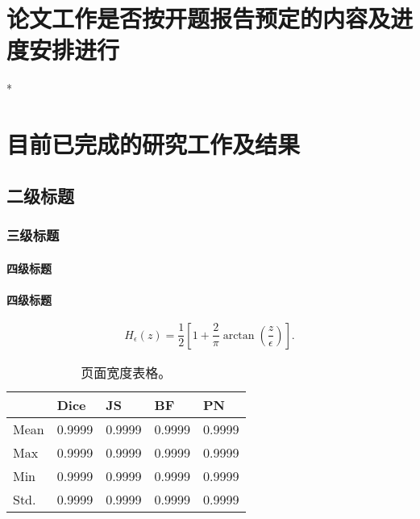 \section{论文工作是否按开题报告预定的内容及进度安排进行}*

\lipsum[1]

\section{目前已完成的研究工作及结果}

\subsection{二级标题}
\subsubsection{三级标题}
\paragraph{四级标题}
\lipsum[2]
\paragraph{四级标题}

\begin{equation}
    H_{\epsilon}(z)=\frac{1}{2}\left[1+\frac{2}{\pi} \arctan \left(\frac{z}{\epsilon}\right)\right] .
\end{equation}

\lipsum[3]

\begin{table}[htbp]
    \caption{页面宽度表格。}
    \begin{tabularx}{\textwidth}{*{5}{Y}}
        \toprule
             & Dice   & JS     & BF     & PN     \\
        \midrule
        Mean & 0.9999 & 0.9999 & 0.9999 & 0.9999 \\
        Max  & 0.9999 & 0.9999 & 0.9999 & 0.9999 \\
        Min  & 0.9999 & 0.9999 & 0.9999 & 0.9999 \\
        Std. & 0.9999 & 0.9999 & 0.9999 & 0.9999 \\
        \bottomrule
    \end{tabularx}
    \label{tab: quantitatively evaluation results}
\end{table}


